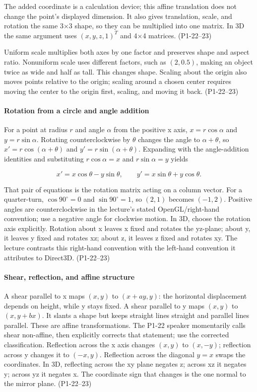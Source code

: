 The added coordinate is a calculation device; this affine translation does not change the point's displayed dimension. It also gives translation, scale, and rotation the same 3×3 shape, so they can be multiplied into one matrix. In 3D the same argument uses \((x,y,z,1)^T\) and 4×4 matrices. (P1-22--23)

Uniform scale multiplies both axes by one factor and preserves shape and aspect ratio. Nonuniform scale uses different factors, such as \((2,0.5)\), making an object twice as wide and half as tall. This changes shape. Scaling about the origin also moves points relative to the origin; scaling around a chosen center requires moving the center to the origin first, scaling, and moving it back. (P1-22--23)

\paragraph{Rotation from a circle and angle addition}\label{rotation-from-a-circle-and-angle-addition}

For a point at radius \(r\) and angle \(\alpha\) from the positive x axis, \(x=r\cos\alpha\) and \(y=r\sin\alpha\). Rotating counterclockwise by \(\theta\) changes the angle to \(\alpha+\theta\), so \(x'=r\cos(\alpha+\theta)\) and \(y'=r\sin(\alpha+\theta)\). Expanding with the angle-addition identities and substituting \(r\cos\alpha=x\) and \(r\sin\alpha=y\) yields

\[
x'=x\cos\theta-y\sin\theta,\qquad y'=x\sin\theta+y\cos\theta.
\]

That pair of equations is the rotation matrix acting on a column vector. For a quarter-turn, \(\cos90^\circ=0\) and \(\sin90^\circ=1\), so \((2,1)\) becomes \((-1,2)\). Positive angles are counterclockwise in the lecture's stated OpenGL/right-hand convention; use a negative angle for clockwise motion. In 3D, choose the rotation axis explicitly. Rotation about x leaves x fixed and rotates the yz-plane; about y, it leaves y fixed and rotates xz; about z, it leaves z fixed and rotates xy. The lecture contrasts this right-hand convention with the left-hand convention it attributes to Direct3D. (P1-22--23)

\paragraph{Shear, reflection, and affine structure}\label{shear-reflection-and-affine-structure}

A shear parallel to x maps \((x,y)\) to \((x+ay,y)\): the horizontal displacement depends on height, while y stays fixed. A shear parallel to y maps \((x,y)\) to \((x,y+bx)\). It slants a shape but keeps straight lines straight and parallel lines parallel. These are affine transformations. The P1-22 speaker momentarily calls shear non-affine, then explicitly corrects that statement; use the corrected classification. Reflection across the x axis changes \((x,y)\) to \((x,-y)\); reflection across y changes it to \((-x,y)\). Reflection across the diagonal \(y=x\) swaps the coordinates. In 3D, reflecting across the xy plane negates z; across xz it negates y; across yz it negates x. The coordinate sign that changes is the one normal to the mirror plane. (P1-22--23)


